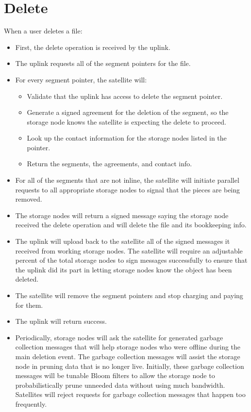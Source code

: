 \documentclass[11pt,fleqn,openany]{book}
\begin{document}
\section{Delete}

When a user deletes a file:

\begin{itemize}
\item First, the delete operation is received by the uplink.
\item The uplink requests all of the segment pointers for the file.
\item For every segment pointer, the satellite will:
  \begin{itemize}
  \item Validate that the uplink has access to delete the segment pointer.
  \item Generate a signed agreement for the deletion of the segment, so the
    storage node knows the satellite is expecting the delete to proceed.
  \item Look up the contact information for the storage nodes listed in the
  pointer.
  \item Return the segments, the agreements, and contact info.
  \end{itemize}
\item For all of the segments that are not inline, the satellite will
  initiate parallel requests to all appropriate storage nodes to signal that the
  pieces are being removed.
\item The storage nodes will return a signed message saying the storage node
received
the
  delete operation and will delete the file and its bookkeeping info.
\item The uplink will upload back to the satellite all of the signed
  messages it received from working storage nodes. The satellite will require an
  adjustable percent of the total storage nodes to sign messages successfully
  to ensure that the uplink did its part in letting storage nodes know the
  object
  has been deleted.
\item The satellite will remove the segment pointers and stop charging and
  paying for them.
\item The uplink will return success.
\item Periodically, storage nodes will ask the satellite for generated garbage
  collection messages that will help storage nodes who were offline during the
  main
  deletion event.
  The garbage collection messages will assist the storage node in pruning data
  that is
  no longer live. Initially, these garbage collection messages will be tunable
  Bloom filters to allow the storage node to probabilistically prune unneeded
  data
  without using much bandwidth.
  Satellites will reject requests for garbage collection messages that
  happen too frequently.
\end{itemize}
\end{document}
